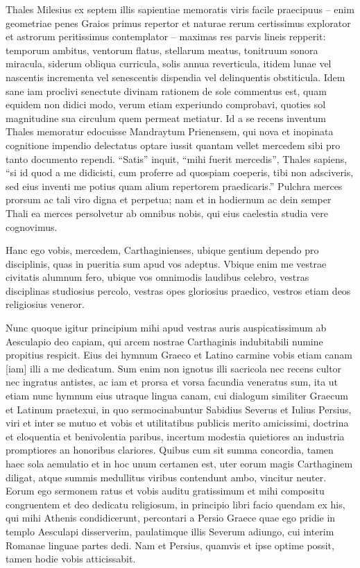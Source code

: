 Thales Milesius ex septem illis sapientiae memoratis viris facile praecipuus – enim geometriae penes Graios primus repertor et naturae rerum certissimus explorator et astrorum peritissimus contemplator – maximas res parvis lineis repperit: temporum ambitus, ventorum flatus, stellarum meatus, tonitruum sonora miracula, siderum obliqua curricula, solis annua reverticula, itidem lunae vel nascentis incrementa vel senescentis dispendia vel delinquentis obstiticula. Idem sane iam proclivi senectute divinam rationem de sole commentus est, quam equidem non didici modo, verum etiam experiundo comprobavi, quoties sol magnitudine sua circulum quem permeat metiatur. Id a se recens inventum Thales memoratur edocuisse Mandraytum Prienensem, qui nova et inopinata cognitione impendio delectatus optare iussit quantam vellet mercedem sibi pro tanto documento rependi. ``Satis'' inquit, ``mihi fuerit mercedis'', Thales sapiens, ``si id quod a me didicisti, cum proferre ad quospiam coeperis, tibi non adsciveris, sed eius inventi me potius quam alium repertorem praedicaris.'' Pulchra merces prorsum ac tali viro digna et perpetua; nam et in hodiernum ac dein semper Thali ea merces persolvetur ab omnibus nobis, qui eius caelestia studia vere cognovimus. 

Hanc ego vobis, mercedem, Carthaginienses, ubique gentium dependo pro disciplinis, quas in pueritia sum apud vos adeptus. Vbique enim me vestrae civitatis alumnum fero, ubique vos omnimodis laudibus celebro, vestras disciplinas studiosius percolo, vestras opes gloriosius praedico, vestros etiam deos religiosius veneror. 

Nunc quoque igitur principium mihi apud vestras auris auspicatissimum ab Aesculapio deo capiam, qui arcem nostrae Carthaginis indubitabili numine propitius respicit. Eius dei hymnum Graeco et Latino carmine vobis etiam canam [iam] illi a me dedicatum. Sum enim non ignotus illi sacricola nec recens cultor nec ingratus antistes, ac iam et prorsa et vorsa facundia veneratus sum, ita ut etiam nunc hymnum eius utraque lingua canam, cui dialogum similiter Graecum et Latinum praetexui, in quo sermocinabuntur Sabidius Severus et Iulius Persius, viri et inter se mutuo et vobis et utilitatibus publicis merito amicissimi, doctrina et eloquentia et benivolentia paribus, incertum modestia quietiores an industria promptiores an honoribus clariores. Quibus cum sit summa concordia, tamen haec sola aemulatio et in hoc unum certamen est, uter eorum magis Carthaginem diligat, atque summis medullitus viribus contendunt ambo, vincitur neuter. Eorum ego sermonem ratus et vobis auditu gratissimum et mihi compositu congruentem et deo dedicatu religiosum, in principio libri facio quendam ex his, qui mihi Athenis condidicerunt, percontari a Persio Graece quae ego pridie in templo Aesculapi disserverim, paulatimque illis Severum adiungo, cui interim Romanae linguae partes dedi. Nam et Persius, quamvis et ipse optime possit, tamen hodie vobis atticissabit. 


